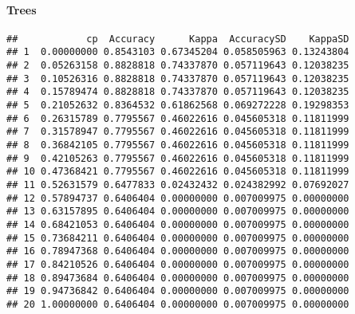 \documentclass[]{article}
\newenvironment{Shaded}{\begin{snugshade}}{\end{snugshade}}
\newcommand{\CommentTok}[1]{\textcolor[rgb]{0.56,0.35,0.01}{\textit{#1}}}
\newcommand{\DataTypeTok}[1]{\textcolor[rgb]{0.13,0.29,0.53}{#1}}
\newcommand{\DecValTok}[1]{\textcolor[rgb]{0.00,0.00,0.81}{#1}}
\newcommand{\KeywordTok}[1]{\textcolor[rgb]{0.13,0.29,0.53}{\textbf{#1}}}
\newcommand{\NormalTok}[1]{#1}
\newcommand{\OperatorTok}[1]{\textcolor[rgb]{0.81,0.36,0.00}{\textbf{#1}}}
\newcommand{\OtherTok}[1]{\textcolor[rgb]{0.56,0.35,0.01}{#1}}
\newcommand{\StringTok}[1]{\textcolor[rgb]{0.31,0.60,0.02}{#1}}
\let\oldparagraph\paragraph
\renewcommand{\paragraph}[1]{\oldparagraph{#1}\mbox{}}
\begin{document}
\newpage

\hypertarget{trees}{%
\paragraph{Trees}\label{trees}}

\begin{Shaded}
\end{Shaded}

\begin{verbatim}
##            cp  Accuracy      Kappa  AccuracySD    KappaSD
## 1  0.00000000 0.8543103 0.67345204 0.058505963 0.13243804
## 2  0.05263158 0.8828818 0.74337870 0.057119643 0.12038235
## 3  0.10526316 0.8828818 0.74337870 0.057119643 0.12038235
## 4  0.15789474 0.8828818 0.74337870 0.057119643 0.12038235
## 5  0.21052632 0.8364532 0.61862568 0.069272228 0.19298353
## 6  0.26315789 0.7795567 0.46022616 0.045605318 0.11811999
## 7  0.31578947 0.7795567 0.46022616 0.045605318 0.11811999
## 8  0.36842105 0.7795567 0.46022616 0.045605318 0.11811999
## 9  0.42105263 0.7795567 0.46022616 0.045605318 0.11811999
## 10 0.47368421 0.7795567 0.46022616 0.045605318 0.11811999
## 11 0.52631579 0.6477833 0.02432432 0.024382992 0.07692027
## 12 0.57894737 0.6406404 0.00000000 0.007009975 0.00000000
## 13 0.63157895 0.6406404 0.00000000 0.007009975 0.00000000
## 14 0.68421053 0.6406404 0.00000000 0.007009975 0.00000000
## 15 0.73684211 0.6406404 0.00000000 0.007009975 0.00000000
## 16 0.78947368 0.6406404 0.00000000 0.007009975 0.00000000
## 17 0.84210526 0.6406404 0.00000000 0.007009975 0.00000000
## 18 0.89473684 0.6406404 0.00000000 0.007009975 0.00000000
## 19 0.94736842 0.6406404 0.00000000 0.007009975 0.00000000
## 20 1.00000000 0.6406404 0.00000000 0.007009975 0.00000000
\end{verbatim}
\end{document}
